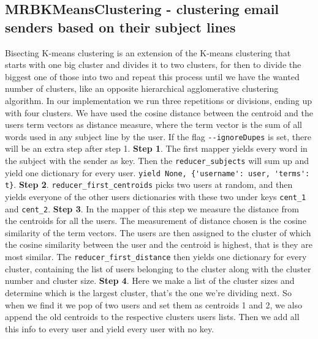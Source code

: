 \documentclass[runningheads,a4paper]{llncs}
\begin{document}
\subsection{MRBKMeansClustering - clustering email senders based on their subject lines}
\label{sec:bkmeans}
Bisecting K-means clustering is an extension of the K-means clustering that starts with one big cluster and divides it to two clusters, for then to divide the biggest one of those into two and repeat this process until we have the wanted number of clusters, like an opposite hierarchical agglomerative clustering algorithm. \cite{dat630slides}
\newline
In our implementation we run three repetitions or divisions, ending up with four clusters. We have used the cosine distance between the centroid and the users term vectors as distance measure, where the term vector is the sum of all words used in any subject line by the user. If the flag \verb!--ignoreDupes! is set, there will be an extra step after step 1.
\newline
\textbf{Step 1}. The first mapper yields every word in the subject with the sender as key. Then the \verb!reducer_subjects! will sum up and yield one dictionary for every user.
\newline
\verb!yield None, {'username': user, 'terms': t}!.
\newline
\textbf{Step 2}. \verb!reducer_first_centroids! picks two users at random, and then yields everyone of the other users dictionaries with these two under keys \verb!cent_1! and \verb!cent_2!.
\newline
\textbf{Step 3}. In the mapper of this step we measure the distance from the centroids for all the users. The measurement of distance chosen is the cosine similarity of the term vectors. The users are then assigned to the cluster of which the cosine similarity between the user and the centroid is highest, that is they are most similar. The \verb!reducer_first_distance! then yields one dictionary for every cluster, containing the list of users belonging to the cluster along with the cluster number and cluster size.
\newline
\textbf{Step 4}. Here we make a list of the cluster sizes and determine which is the largest cluster, that's the one we're dividing next. So when we find it we pop of two users and set them as centroids 1 and 2, we also append the old centroids to the respective clusters users lists. Then we add all this info  to every user and yield every user with no key.
\newline
\end{document}
